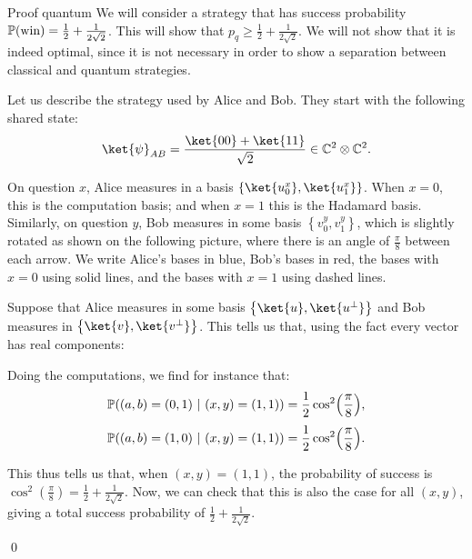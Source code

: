\documentclass[a4paper]{article}
\begin{document}
\begin{parag}{}
    \begin{subparag}{Proof quantum}
        We will consider a strategy that has success probability $\prob\left(\text{win}\right) = \frac{1}{2} + \frac{1}{2\sqrt{2}}$. This will show that $p_q \geq \frac{1}{2} + \frac{1}{2\sqrt{2}}$. We will not show that it is indeed optimal, since it is not necessary in order to show a separation between classical and quantum strategies.

        Let us describe the strategy used by Alice and Bob. They start with the following shared state:
        \[\ket{\psi}_{AB} = \frac{\ket{00} + \ket{11}}{\sqrt{2}} \in \mathbb{C}^2 \otimes \mathbb{C}^2.\]
        
        On question $x$, Alice measures in a basis $\left\{\ket{u_0^x}, \ket{u_1^x}\right\}$. When $x = 0$, this is the computation basis; and when $x = 1$ this is the Hadamard basis. Similarly, on question $y$, Bob measures in some basis $\left\{v_0^y, v_1^y\right\}$, which is slightly rotated as shown on the following picture, where there is an angle of $\frac{\pi}{8}$ between each arrow. We write Alice's bases in blue, Bob's bases in red, the bases with $x = 0$ using solid lines, and the bases with $x = 1$ using dashed lines.
        
        Suppose that Alice measures in some basis $\left\{\ket{u}, \ket{u^\perp}\right\}$ and Bob measures in $\left\{\ket{v}, \ket{v^\perp}\right\}$. This tells us that, using the fact every vector has real components: 

        Doing the computations, we find for instance that:
        \[\prob\left(\left(a, b\right) = \left(0, 1\right) \suchthat \left(x, y\right) = \left(1, 1\right)\right) = \frac{1}{2} \cos^2\left(\frac{\pi}{8}\right),\]
        \[\prob\left(\left(a, b\right) = \left(1, 0\right) \suchthat \left(x, y\right) = \left(1, 1\right)\right) = \frac{1}{2} \cos^2\left(\frac{\pi}{8}\right).\]
        
        This thus tells us that, when $\left(x, y\right) = \left(1, 1\right)$, the probability of success is $\cos^2\left(\frac{\pi}{8}\right) = \frac{1}{2} + \frac{1}{2\sqrt{2}}$. Now, we can check that this is also the case for all $\left(x, y\right)$, giving a total success probability of $\frac{1}{2} + \frac{1}{2 \sqrt{2}}$. 

        \qed
    \end{subparag}
\end{parag}
\end{document}
